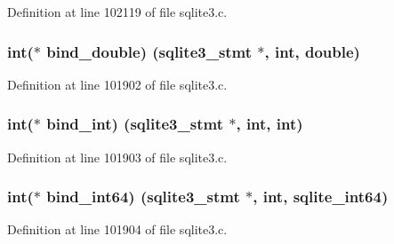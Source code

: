 Definition at line 102119 of file sqlite3.\+c.

\hypertarget{structsqlite3__api__routines_ab4d39a409179d9867682778b2a5fef30}{}
\subsubsection[{bind\+\_\+double}]{\setlength{\rightskip}{0pt plus 5cm}int($\ast$ bind\+\_\+double) ({\bf sqlite3\+\_\+stmt} $\ast$, int, double)}\label{structsqlite3__api__routines_ab4d39a409179d9867682778b2a5fef30}


Definition at line 101902 of file sqlite3.\+c.

\hypertarget{structsqlite3__api__routines_ad202f7ba64d1fbcbe903ae656292852b}{}
\subsubsection[{bind\+\_\+int}]{\setlength{\rightskip}{0pt plus 5cm}int($\ast$ bind\+\_\+int) ({\bf sqlite3\+\_\+stmt} $\ast$, int, int)}\label{structsqlite3__api__routines_ad202f7ba64d1fbcbe903ae656292852b}


Definition at line 101903 of file sqlite3.\+c.

\hypertarget{structsqlite3__api__routines_aedceaa5c8cf3964a314cfa9e27169ae9}{}
\subsubsection[{bind\+\_\+int64}]{\setlength{\rightskip}{0pt plus 5cm}int($\ast$ bind\+\_\+int64) ({\bf sqlite3\+\_\+stmt} $\ast$, int, {\bf sqlite\+\_\+int64})}\label{structsqlite3__api__routines_aedceaa5c8cf3964a314cfa9e27169ae9}


Definition at line 101904 of file sqlite3.\+c.

\hypertarget{structsqlite3__api__routines_a2dd582c7cf3a0bb65c1f8da45700bbac}{}
